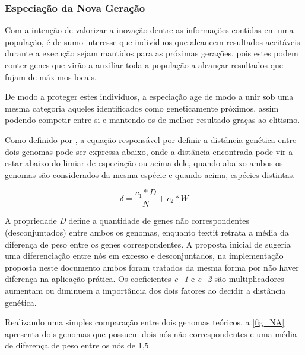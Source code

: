 \subsubsection{Especiação da Nova Geração}
Com a intenção de valorizar a inovação dentre as informações contidas em uma população, é de sumo interesse que indivíduos que alcancem resultados aceitáveis durante a execução sejam mantidos para as próximas gerações, pois estes podem conter genes que virão a auxiliar toda a população a alcançar resultados que fujam de máximos locais.

De modo a proteger estes indivíduos, a especiação age de modo a unir sob uma mesma categoria aqueles identificados como geneticamente próximos, assim podendo competir entre si e mantendo os de melhor resultado graças ao elitismo.

Como definido por , a equação responsável por definir a distância genética entre dois genomas pode ser expressa abaixo, onde a distância  encontrada pode vir a estar abaixo do limiar de especiação ou acima dele, quando abaixo ambos os genomas são considerados da mesma espécie e quando acima, espécies distintas.

\[ \delta = \frac{c_1 * D}{N} + c_2 * \overline{W}\]

A propriedade \textit{D} define a quantidade de genes não correspondentes (desconjuntados) entre ambos os genomas, enquanto textit{} retrata a média da diferença de peso entre os genes correspondentes. A proposta inicial de  sugeria uma diferenciação entre nós em excesso e desconjuntados, na implementação proposta neste documento ambos foram tratados da mesma forma por não haver diferença na aplicação prática. Os coeficientes \textit{c_1} e \textit{c_2} são multiplicadores aumentam ou diminuem a importância dos dois fatores ao decidir a distância genética.

Realizando uma simples comparação entre dois genomas teóricos, a \autoref{fig_NA} apresenta dois genomas que possuem dois nós não correspondentes e uma média de diferença de peso entre os nós de 1,5.

